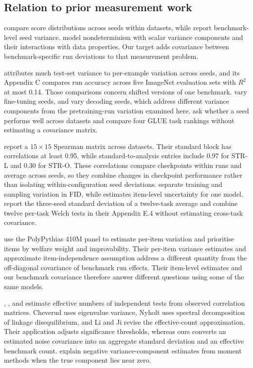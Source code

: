 \subsection{Relation to prior measurement work}
\citet{reimers2017} compare score distributions across seeds within datasets, while \citet{madaan2024} report benchmark-level seed variance. \citet{hagmann2023} model nondeterminism with scalar variance components and their interactions with data properties. Our target adds covariance between benchmark-specific run deviations to that measurement problem.

\citet{jordan2024} attributes much test-set variance to per-example variation across seeds, and its Appendix C compares run accuracy across five ImageNet evaluation sets with $R^2$ at most 0.14. Those comparisons concern shifted versions of one benchmark. \citet{bui2025} vary fine-tuning seeds, and \citet{hochlehnert2025} vary decoding seeds, which address different variance components from the pretraining-run variation examined here. \citet[Section 4.3]{dodge2020} ask whether a seed performs well across datasets and compare four GLUE task rankings without estimating a covariance matrix.

\citet[Figure 3]{zhou2020} report a $15\times15$ Spearman matrix across datasets. Their standard block has correlations at least 0.95, while standard-to-analysis entries include 0.97 for STR-L and 0.30 for STR-O. These correlations compare checkpoints within runs and average across seeds, so they combine changes in checkpoint performance rather than isolating within-configuration seed deviations. \citet{dufour2026} separate training and sampling variation in FID, while \citet{miller2024} estimates item-level uncertainty for one model. \citet{zhao2026} report the three-seed standard deviation of a twelve-task average and combine twelve per-task Welch tests in their Appendix E.4 without estimating cross-task covariance.

\citet{haupt2026} use the PolyPythias 410M panel to estimate per-item variation and prioritise items by welfare weight and improvability. Their per-item variance estimates and approximate item-independence assumption address a different quantity from the off-diagonal covariance of benchmark run effects. Their item-level estimates and our benchmark covariance therefore answer different questions using some of the same models.

\citet{cheverud2001}, \citet{nyholt2004}, and \citet{li2005} estimate effective numbers of independent tests from observed correlation matrices. Cheverud uses eigenvalue variance, Nyholt uses spectral decomposition of linkage disequilibrium, and Li and Ji revise the effective-count approximation. Their application adjusts significance thresholds, whereas ours converts an estimated noise covariance into an aggregate standard deviation and an effective benchmark count. \citet{searle1992} explain negative variance-component estimates from moment methods when the true component lies near zero.

